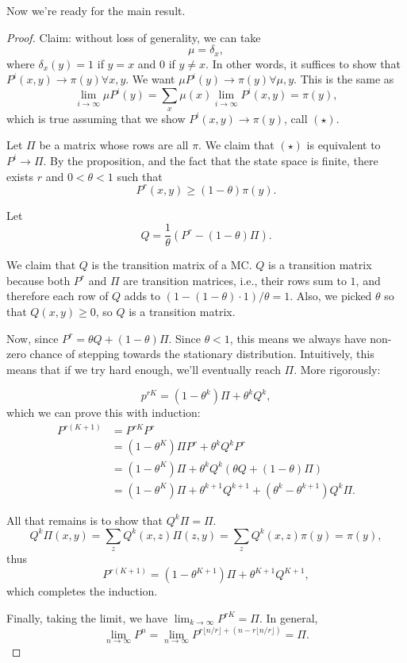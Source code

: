 Now we're ready for the main result. 
\begin{proof}
Claim: without loss of generality, we can take 
\[\mu = \delta_x,\]
where $\delta_x(y) = 1$ if $y=x$ and $0$ if $y\neq x$. In other words, it suffices to show that $P^i(x,y)\rightarrow \pi(y)\forall x,y$. We want $\mu P^i(y)\rightarrow \pi(y)\forall \mu, y$. This is the same as 
\[\lim_{i\rightarrow \infty}\mu P^i(y) = \sum_x\mu(x)\lim_{i\rightarrow \infty}P^i(x,y) = \pi(y),\]
which is true assuming that we show $P^i(x,y)\rightarrow \pi(y)$, call $(\star)$. 

Let $\Pi$ be a matrix whose rows are all $\pi$. We claim that $(\star)$ is equivalent to $P^i\rightarrow \Pi$. By the proposition, and the fact that the state space is finite, there exists $r$ and $0<\theta < 1$ such that 
\[P^r(x,y)\geq (1-\theta)\pi(y).\]

Let \[Q = \frac{1}{\theta}(P^r - (1-\theta)\Pi).\]

We claim that $Q$ is the transition matrix of a MC. $Q$ is a transition matrix because both $P^r$ and $\Pi$ are transition matrices, i.e., their rows sum to $1$, and therefore each row of $Q$ adds to $(1-(1-\theta)\cdot 1)/\theta = 1$. Also, we picked $\theta$ so that $Q(x,y)\geq 0$, so $Q$ is a transition matrix. 

Now, since $P^r = \theta Q + (1-\theta)\Pi$. Since $\theta < 1$, this means we always have non-zero chance of stepping towards the stationary distribution. Intuitively, this means that if we try hard enough, we'll eventually reach $\Pi$. More rigorously: 

\[p^{rK} = (1-\theta^k)\Pi + \theta^kQ^k,\]
which we can prove this with induction:
\begin{align*}
    P^{r(K+1)} &= P^{rK}P^r \\
    &= (1-\theta^K)\Pi P^r + \theta^{k}Q^kP^r \\
    &= (1-\theta^K)\Pi + \theta^kQ^k(\theta Q + (1-\theta)\Pi) \\
    &= (1-\theta^K)\Pi + \theta^{k+1}Q^{k+1} + (\theta^k-\theta^{k+1})Q^k\Pi.
\end{align*}

All that remains is to show that $Q^k\Pi = \Pi$. 
\[Q^k\Pi(x,y) = \sum_z Q^k(x,z)\Pi(z,y) = \sum_z Q^k(x,z)\pi(y) = \pi(y), \]
thus 
\[P^{r(K+1)} = (1-\theta^{K+1})\Pi + \theta^{K+1}Q^{K+1},\]
which completes the induction.

Finally, taking the limit, we have $\lim_{k\rightarrow \infty}P^{rK} = \Pi$. In general, 
\[\lim_{n\rightarrow \infty}P^n = \lim_{n\rightarrow \infty}P^{r\lfloor n/r\rfloor + (n - r\lfloor n/r\rfloor)} = \Pi. \]
\end{proof}